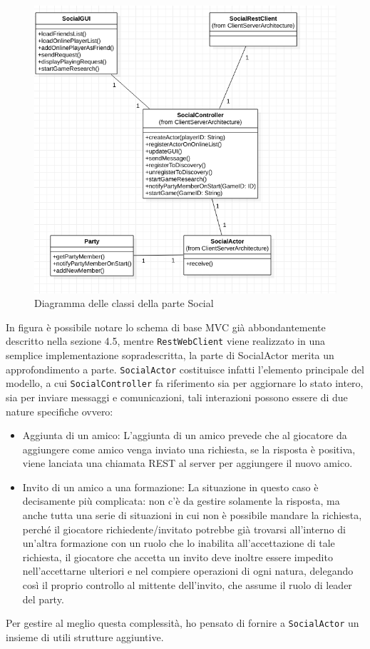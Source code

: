 \begin{figure}[H]
	\includegraphics[width=\textwidth,height=\textheight,keepaspectratio]{socialArchitecture}
	\caption{Diagramma delle classi della parte Social}
\end{figure}

In figura è possibile notare lo schema di base MVC già abbondantemente descritto nella sezione 4.5, mentre \texttt{RestWebClient} viene realizzato in una semplice implementazione sopradescritta, la parte di SocialActor merita un approfondimento a parte.
\texttt{SocialActor} costituisce infatti l'elemento principale del modello, a cui \texttt{SocialController} fa riferimento sia per aggiornare lo stato intero, sia per inviare messaggi e comunicazioni, tali interazioni possono essere di due nature specifiche ovvero:
\begin{itemize}
	\item Aggiunta di un amico: L'aggiunta di un amico prevede che al giocatore da aggiungere come amico venga inviato una richiesta, se la risposta è positiva, viene lanciata una chiamata REST al server per aggiungere il nuovo amico.
	\item Invito di un amico a una formazione: La situazione in questo caso è decisamente più complicata: non c'è da gestire solamente la risposta, ma anche tutta una serie di situazioni in cui non è possibile mandare la richiesta, perché il giocatore richiedente/invitato potrebbe già trovarsi all'interno di un'altra formazione con un ruolo che lo inabilita all'accettazione di tale richiesta, il giocatore che accetta un invito deve inoltre essere impedito nell'accettarne ulteriori e nel compiere operazioni di ogni natura, delegando così il proprio controllo al mittente dell'invito, che assume il ruolo di leader del party. 
\end{itemize}
Per gestire al meglio questa complessità, ho pensato di fornire a \texttt{SocialActor} un insieme di utili strutture aggiuntive.

